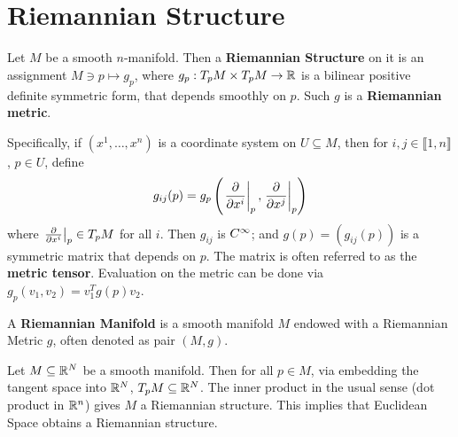 \documentclass{article}
\begin{document}

\tableofcontents
\newpage

\section{Riemannian Structure}

\begin{definition}
    Let $M$ be a smooth $n$-manifold. Then a \textbf{Riemannian Structure} on it is an assignment $M \ni p \mapsto g_p$, where $g_p: T_p M \times T_p M \to \mathbb{R}$ is a bilinear positive definite symmetric form, that depends smoothly on $p$. Such $g$ is a \textbf{Riemannian metric}. 
    
    Specifically, if $(x^1, \dots, x^n)$ is a coordinate system on $U \subseteq M$, then for $i, j \in \llbracket 1, n \rrbracket$, $p \in U$, define
    \[
        g_{ij}(p) = g_p\left(\left.\frac{\partial }{\partial x^i}\right|_{p}, \left.\frac{\partial }{\partial x^j}\right|_{p}\right)
    \]
    where $\left.\frac{\partial }{\partial x^i}\right|_{p} \in T_p M$ for all $i$. Then $g_{ij}$ is $C^{\infty}$; and $g(p) = (g_{ij}(p))$ is a symmetric matrix that depends on $p$. The matrix is often referred to as the \textbf{metric tensor}. Evaluation on the metric can be done via $g_p(v_1, v_2) = v_1^T g(p) v_2$.
\end{definition}

\begin{definition}
    A \textbf{Riemannian Manifold} is a smooth manifold $M$ endowed with a Riemannian Metric $g$, often denoted as pair $(M, g)$. 
\end{definition}

\begin{example}
    Let $M \subseteq \mathbb{R}^N$ be a smooth manifold. Then for all $p \in M$, via embedding the tangent space into $\mathbb{R}^N$, $T_p M \subseteq \mathbb{R}^N$. The inner product in the usual sense (dot product in $\mathbb{R}^n$) gives $M$ a Riemannian structure. This implies that Euclidean Space obtains a Riemannian structure. 
\end{example}
\end{document}

